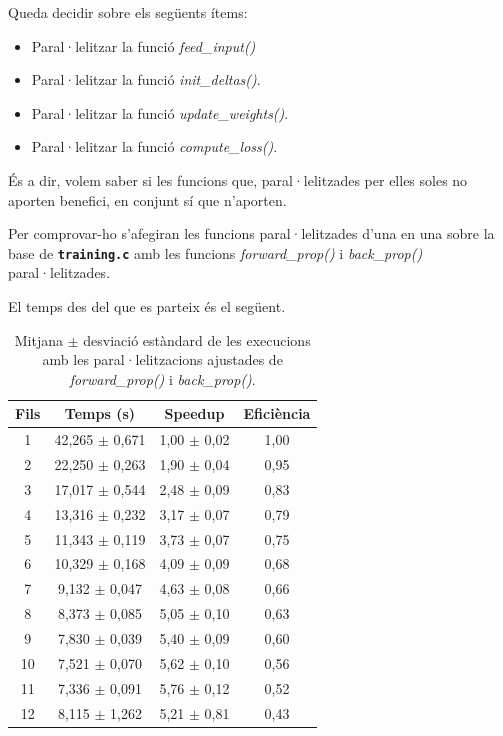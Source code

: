 \documentclass{article}
\begin{document}
Queda decidir sobre els següents ítems:

\begin{itemize}
    \item Paral·lelitzar la funció \textit{feed\_input()}
    \item Paral·lelitzar la funció \textit{init\_deltas()}.
    \item Paral·lelitzar la funció \textit{update\_weights()}.
    \item Paral·lelitzar la funció \textit{compute\_loss()}.
\end{itemize}

És a dir, volem saber si les funcions que, paral·lelitzades per elles soles no aporten benefici, en conjunt sí que n'aporten.

Per comprovar-ho s'afegiran les funcions paral·lelitzades d'una en una sobre la base de \textbf{\texttt{training.c}} amb les funcions \textit{forward\_prop()} i \textit{back\_prop()} paral·lelitzades.

El temps des del que es parteix és el següent.

\begin{table}[H]
\centering
\begin{tabular}{|c|c|c|c|}
\hline
\textbf{Fils} & \textbf{Temps (s)} & \textbf{Speedup} & \textbf{Eficiència} \\ \hline
1 & 42,265 $\pm$ 0,671 & 1,00 $\pm$ 0,02 & 1,00 \\ \hline
2 & 22,250 $\pm$ 0,263 & 1,90 $\pm$ 0,04 & 0,95 \\ \hline
3 & 17,017 $\pm$ 0,544 & 2,48 $\pm$ 0,09 & 0,83 \\ \hline
4 & 13,316 $\pm$ 0,232 & 3,17 $\pm$ 0,07 & 0,79 \\ \hline
5 & 11,343 $\pm$ 0,119 & 3,73 $\pm$ 0,07 & 0,75 \\ \hline
6 & 10,329 $\pm$ 0,168 & 4,09 $\pm$ 0,09 & 0,68 \\ \hline
7 & 9,132 $\pm$ 0,047 & 4,63 $\pm$ 0,08 & 0,66 \\ \hline
8 & 8,373 $\pm$ 0,085 & 5,05 $\pm$ 0,10 & 0,63 \\ \hline
9 & 7,830 $\pm$ 0,039 & 5,40 $\pm$ 0,09 & 0,60 \\ \hline
10 & 7,521 $\pm$ 0,070 & 5,62 $\pm$ 0,10 & 0,56 \\ \hline
11 & 7,336 $\pm$ 0,091 & 5,76 $\pm$ 0,12 & 0,52 \\ \hline
12 & 8,115 $\pm$ 1,262 & 5,21 $\pm$ 0,81 & 0,43 \\ \hline
\end{tabular}
\caption{Mitjana $\pm$ desviació estàndard de les execucions amb les paral·lelitzacions ajustades de \textit{forward\_prop()} i \textit{back\_prop()}.  }
\label{tab:resultats4}
\end{table}
\end{document}
